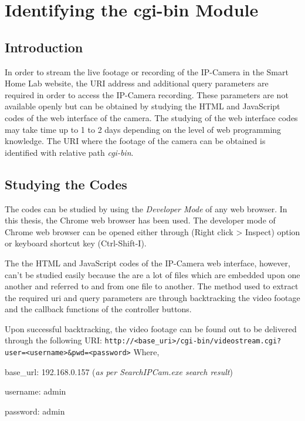 \section{Identifying the cgi-bin Module}
\subsection*{Introduction}
In order to stream the live footage or recording of the IP-Camera in the Smart Home Lab website, the URI address and additional query parameters are required in order to access the IP-Camera recording. These parameters are not available openly but can be obtained by studying the HTML and JavaScript codes of the web interface of the camera. The studying of the web interface codes may take time up to 1 to 2 days depending on the level of web programming knowledge. The URI where the footage of the camera can be obtained is identified with relative path \emph{cgi-bin}.

\subsection*{Studying the Codes}\label{sec:cctv-studying-the-codes}
The codes can be studied by using the \emph{Developer Mode} of any web browser. In this thesis, the Chrome web browser has been used. The developer mode of Chrome web browser can be opened either through (Right click {\textgreater} Inspect) option or keyboard shortcut key (Ctrl-Shift-I).

The the HTML and JavaScript codes of the IP-Camera web interface, however, can't be studied easily because the are a lot of files which are embedded upon one another and referred to and from one file to another. The method used to extract the required \ac{uri} and query parameters are through backtracking the video footage and the callback functions of the controller buttons.

Upon successful backtracking, the video footage can be found out to be delivered through the following URI:
\newline
\texttt{\footnotesize{http://\textless base\_uri\textgreater/cgi-bin/videostream.cgi?user=\textless username\textgreater\&pwd=\textless password\textgreater}}
\newline
Where,
\begin{itemize*}
\item base\_url: 192.168.0.157 (\emph{as per SearchIPCam.exe search result})
\item username: admin
\item password: admin
\end{itemize*}

